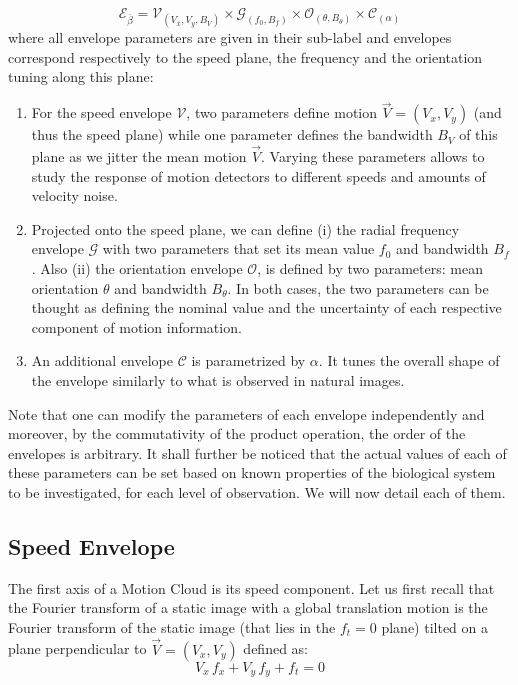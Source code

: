 \documentclass[a4paper,11pt]{article}%
\begin{document}
\begin{equation} %
\mathcal{E}_{\bar{\beta}}= \mathcal{V}_{(V_x, V_y, B_{V})} \times %
\mathcal{G}_{(f_0,B_{f})} \times \mathcal{O}_{(\theta,B_\theta)}  \times %
\mathcal{C}_{(\alpha)} %
\label{eq:synthesis} %
\end{equation} %
where all envelope parameters are given in their sub-label and envelopes correspond respectively to the speed plane, the frequency and the orientation tuning along this plane: %
\begin{enumerate}
\item For the speed envelope $\mathcal{V}$, two parameters define motion $\vec{V}= (V_x, V_y)$ (and thus the speed plane) while one parameter defines the bandwidth $B_{V}$ of this plane as we jitter the mean motion $\vec{V}$. Varying these parameters allows to study the response of motion detectors to different speeds and amounts of velocity noise. %
\item Projected onto the speed plane, we can define (i) the radial frequency envelope $\mathcal{G}$ with two parameters that set its mean value $f_0$ and bandwidth $B_{f}$.  Also (ii) the orientation envelope $\mathcal{O}$, is defined by two parameters: mean orientation $\theta$ and bandwidth $B_\theta$. In both cases, the two parameters can be thought as defining the nominal value and the uncertainty of each respective component of motion information. %
\item An additional envelope $ \mathcal{C}$ is parametrized by $\alpha$. It tunes the overall shape of the envelope similarly to what is observed in natural images.%
\end{enumerate}

Note that one can modify the parameters of each envelope  independently and moreover, by the commutativity of the product operation, the order of the envelopes is arbitrary. It shall further be noticed that the actual values of each of these parameters can be set based on known properties of the biological system to be investigated, for each level of observation. We will now detail each of them. %

\subsection{Speed Envelope} %
The first axis of a Motion  Cloud is its speed component. Let us first recall that the Fourier transform of a static image with a global translation motion is the Fourier transform of the static image (that lies in the $f_t=0$ plane) tilted on a plane perpendicular to $\vec{V}=(V_x, V_y)$ defined as: %
\begin{equation} %
V_x\,f_x+V_y\,f_y + f_t = 0 %
\label{eq:speed_plane} %
\end{equation} %
\end{document}
